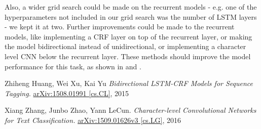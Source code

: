 \documentclass{article}
\begin{document}
Also, a wider grid search could be made on the recurrent models - e.g. one of the hyperparameters not included in our grid search was the number of LSTM layers - we kept it at two. Further improvements could be made to the recurrent models, like implementing a CRF layer on top of the recurrent layer, or making the model bidirectional instead of unidirectional, or implementing a character level CNN below the recurrent layer. These methods should improve the model performance for this task, as shown in \cite{charlevelcnn} and \cite{bilstmcrf}.





\begin{thebibliography}{1}

Zhiheng Huang, Wei Xu, Kai Yu
\newblock \textit{Bidirectional LSTM-CRF Models for Sequence Tagging.}
\newblock \href{https://arxiv.org/abs/1508.01991}{arXiv:1508.01991 [cs.CL]}, 2015

Xiang Zhang, Junbo Zhao, Yann LeCun.
\newblock \textit{Character-level Convolutional Networks for Text Classification.}
\newblock \href{https://arxiv.org/abs/1509.01626}{arXiv:1509.01626v3 [cs.LG]}, 2016

\end{thebibliography}
\end{document}
